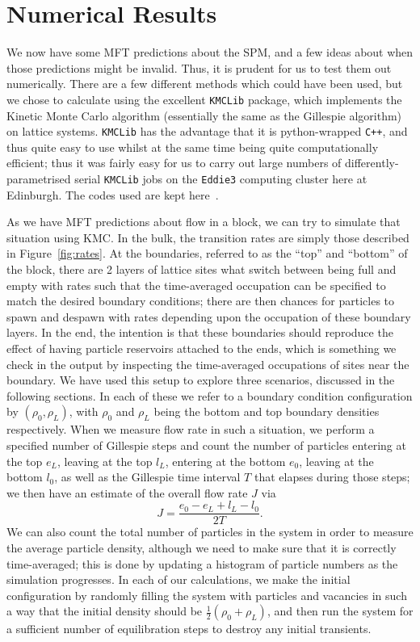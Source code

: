 \section{Numerical Results}
\label{sec:numRes}
We now have some MFT predictions about the SPM, and a few ideas about when those predictions might be invalid. Thus, it is prudent for us to test them out numerically.
There are a few different methods which could have been used, but we chose to calculate using the excellent \texttt{KMCLib}\cite{leetmaa2014kmclib} package, which implements the Kinetic Monte Carlo algorithm
(essentially the same as the Gillespie algorithm\cite{Gillespie1977})
on lattice systems. \texttt{KMCLib} has the advantage that it is python-wrapped \texttt{C++}, and thus quite easy to use whilst at the same time being quite computationally efficient; thus it was fairly easy for us to carry out large numbers
of differently-parametrised serial \texttt{KMCLib} jobs on the \texttt{Eddie3} computing cluster here at Edinburgh. The codes used are kept here~\cite{jHellGitRepo}.

As we have MFT predictions about flow in a block, we can try to simulate that situation using KMC. In the bulk, the transition rates are simply those described in Figure~\ref{fig:rates}. At the boundaries, referred to as the ``top''  and ``bottom''
of the block, there are 2 layers of lattice sites what switch between being full and empty with rates such that the time-averaged occupation can be specified to match the desired boundary conditions; there are then chances for particles to spawn
and despawn with rates depending upon the occupation of these boundary layers. In the end, the intention is that these boundaries should reproduce the effect of having particle reservoirs attached to the ends, which is something we check
in the output by inspecting the time-averaged occupations of sites near the boundary. We have used this setup to explore three scenarios, discussed in the following sections. In each of these we refer to a boundary condition configuration
by $(\rho_0, \rho_L)$, with $\rho_0$ and $\rho_L$ being the bottom and top boundary densities respectively.
When we measure flow rate in such a situation, we perform a specified number of Gillespie steps and count the number of particles entering at the top $e_L$, leaving at the top $l_L$, entering at the bottom $e_0$, leaving at the bottom $l_0$,
as well as the Gillespie time interval $T$ that elapses during those steps; we then have an estimate of the overall flow rate $J$ via
\begin{equation}
 J = \frac{e_0-e_L+l_L-l_0}{2T}.
\end{equation}
We can also count the total number of particles in the system in order to measure the average particle density, although we need to make sure that it is correctly time-averaged; this is done by updating a histogram of particle numbers
as the simulation progresses. In each of our calculations, we make the initial configuration by randomly filling the system with particles and vacancies in such a way that the initial density should be $\frac{1}{2}(\rho_0 + \rho_L)$, and then
run the system for a sufficient number of equilibration steps to destroy any initial transients.

